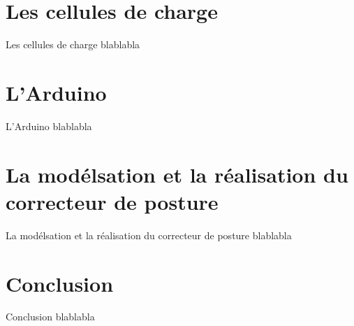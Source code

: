 \documentclass{beamer}
\begin{document}
\section{Les cellules de charge}
\begin{frame}
\begin{block}{Les cellules de charge}
\pause
blablabla
\end{block}
\end{frame}

\section{L'Arduino}
\begin{frame}
\begin{block}{L'Arduino}
\pause
blablabla
\end{block}
\end{frame}

\section{La modélsation et la réalisation du correcteur de posture}
\begin{frame}
\begin{block}{La modélsation et la réalisation du correcteur de posture}
\pause
blablabla
\end{block}
\end{frame}

\section{Conclusion}
\begin{frame}
\begin{block}{Conclusion}
\pause
blablabla
\end{block}
\end{frame}
\end{document}
